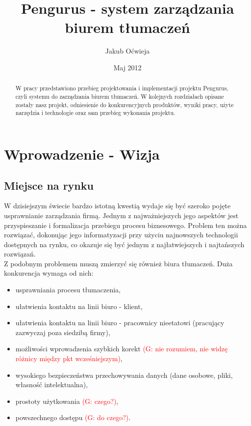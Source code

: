 \documentclass[licencjacka]{pracamgr}
\author{Jakub Oćwieja}
\title{Pengurus - system zarządzania biurem tłumaczeń}
\date{Maj 2012}
\begin{document}
\maketitle

\begin{abstract}
  W pracy przedstawiono przebieg projektowania i implementacji projektu Pengurus, czyli systemu do zarządzania biurem tłumaczeń.
  W kolejnych rozdziałach opisane zostały nasz projekt, odniesienie do konkurencyjnych produktów, wyniki pracy, użyte narzędzia i technologie oraz sam przebieg wykonania projektu.
\end{abstract}

\tableofcontents

\chapter{Wprowadzenie - Wizja}
\section{Miejsce na rynku}
W dzisiejszym świecie bardzo istotną kwestią wydaje się być szeroko pojęte usprawnianie zarządzania firmą. 
Jednym z najważniejszych jego aspektów jest przyspieszanie i formalizacja przebiegu procesu biznesowego. 
Problem ten można rozwiązać, dokonując jego informatyzacji przy użyciu najnowszych technologii dostępnych na rynku, co okazuje się być jednym z najłatwiejszych i najtańszych rozwiązań. \\


Z podobnym problemem muszą zmierzyć się również biura tłumaczeń. Duża konkurencja wymaga od nich: 
\begin{itemize}
\item usprawniania procesu tłumaczenia, 
\item ułatwienia kontaktu na linii biuro - klient, 
\item ułatwienia kontaktu na linii biuro - pracownicy nieetatowi (pracujący zazwyczaj poza siedzibą firmy), 
\item możliwości wprowadzenia szybkich korekt \textcolor{red}{(G: nie rozumiem, nie widzę różnicy między pkt wcześniejszym)},
\item wysokiego bezpieczeństwa przechowywania danych (dane osobowe, pliki, własność intelektualna),
\item prostoty użytkowania \textcolor{red}{(G: czego?)},
\item powszechnego dostępu \textcolor{red}{(G: do czego?)}. 
\end{itemize} 
\end{document}
